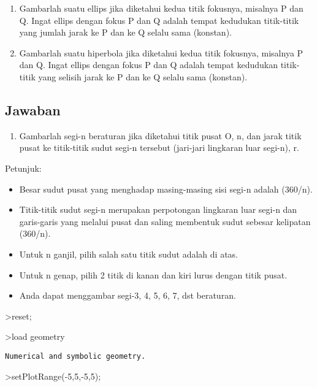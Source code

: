 \documentclass[
]{book}
\providecommand{\tightlist}{%
  \setlength{\itemsep}{0pt}\setlength{\parskip}{0pt}}
\begin{document}
\begin{enumerate}
\def\labelenumi{\arabic{enumi}.}
\setcounter{enumi}{3}
\item
  Gambarlah suatu ellips jika diketahui kedua titik fokusnya, misalnya P dan Q. Ingat ellips dengan fokus P dan Q adalah tempat kedudukan titik-titik yang jumlah jarak ke P dan ke Q selalu sama (konstan).
\item
  Gambarlah suatu hiperbola jika diketahui kedua titik fokusnya, misalnya P dan Q. Ingat ellips dengan fokus P dan Q adalah tempat kedudukan titik-titik yang selisih jarak ke P dan ke Q selalu sama (konstan).
\end{enumerate}

\subsection{Jawaban}\label{jawaban-1}

\begin{enumerate}
\def\labelenumi{\arabic{enumi}.}
\tightlist
\item
  Gambarlah segi-n beraturan jika diketahui titik pusat O, n, dan jarak titik pusat ke titik-titik sudut segi-n tersebut (jari-jari lingkaran luar segi-n), r.
\end{enumerate}

Petunjuk:

\begin{itemize}
\tightlist
\item
  Besar sudut pusat yang menghadap masing-masing sisi segi-n adalah (360/n).
\item
  Titik-titik sudut segi-n merupakan perpotongan lingkaran luar segi-n dan garis-garis yang melalui pusat dan saling membentuk sudut sebesar kelipatan (360/n).
\item
  Untuk n ganjil, pilih salah satu titik sudut adalah di atas.
\item
  Untuk n genap, pilih 2 titik di kanan dan kiri lurus dengan titik pusat.
\item
  Anda dapat menggambar segi-3, 4, 5, 6, 7, dst beraturan.
\end{itemize}

\textgreater reset;

\textgreater load geometry

\begin{verbatim}
Numerical and symbolic geometry.
\end{verbatim}

\textgreater setPlotRange(-5,5,-5,5);
\end{document}
